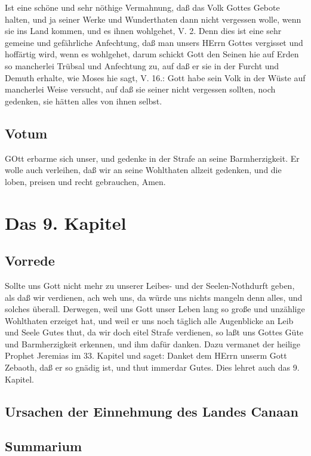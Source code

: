 Ist eine schöne und sehr nöthige Vermahnung, daß das Volk Gottes Gebote halten, und ja seiner Werke und Wunderthaten dann nicht vergessen wolle, wenn sie ins Land kommen, und es ihnen wohlgehet, V. 2. Denn dies ist eine sehr gemeine und gefährliche Anfechtung, daß man unsers HErrn Gottes vergisset und hoffärtig wird, wenn es wohlgehet, darum schickt Gott den Seinen hie auf Erden so mancherlei Trübsal und Anfechtung zu, auf daß er sie in der Furcht und Demuth erhalte, wie Moses hie sagt, V. 16.: Gott habe sein Volk in der Wüste auf mancherlei Weise versucht, auf daß sie seiner nicht vergessen sollten, noch gedenken, sie hätten alles von ihnen selbst.

\section{Votum}

GOtt erbarme sich unser, und gedenke in der Strafe an seine Barmherzigkeit. Er wolle auch verleihen, daß wir an seine Wohlthaten allzeit gedenken, und die loben, preisen und recht gebrauchen, Amen.

\chapter{Das 9. Kapitel}

\section{Vorrede}

Sollte uns Gott nicht mehr zu unserer Leibes- und der Seelen-Nothdurft geben, als daß wir verdienen, ach weh uns, da würde uns nichts mangeln denn alles, und solches überall. Derwegen, weil uns Gott unser Leben lang so große und unzählige Wohlthaten erzeiget hat, und weil er uns noch täglich alle Augenblicke an Leib und Seele Gutes thut, da wir doch eitel Strafe verdienen, so laßt uns Gottes Güte und Barmherzigkeit erkennen, und ihm dafür danken. Dazu vermanet der heilige Prophet Jeremias im 33. Kapitel und saget: Danket dem HErrn unserm Gott Zebaoth, daß er so gnädig ist, und thut immerdar Gutes. Dies lehret auch das 9. Kapitel.

\section{Ursachen der Einnehmung des Landes Canaan}

\section{Summarium}

